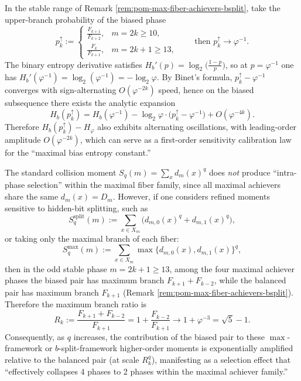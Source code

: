 \begin{remark}[Linear response and alternating oscillation of the maximal bias entropy constant: \texorpdfstring{$H_b'(\varphi^{-1})=-\log_2\varphi$}{Hb'(phi^{-1})=-log2 phi} (227)]\label{rem:pom-max-fiber-hidden-bit-entropy-linear-response}
In the stable range of Remark \ref{rem:pom-max-fiber-achievers-bsplit}, take the upper-branch probability of the biased phase
\[
p_k^{\uparrow}:=
\begin{cases}
\frac{F_{k+1}}{F_{k+2}},& m=2k\ge 10,\\
\frac{F_{k}}{F_{k+1}},& m=2k+1\ge 13,
\end{cases}
\qquad\text{then }p_k^{\uparrow}\to\varphi^{-1}.
\]
The binary entropy derivative satisfies \(H_b'(p)=\log_2\!\bigl(\frac{1-p}{p}\bigr)\), so at \(p=\varphi^{-1}\) one has \(H_b'(\varphi^{-1})=\log_2(\varphi^{-1})=-\log_2\varphi\).
By Binet's formula, \(p_k^{\uparrow}-\varphi^{-1}\) converges with sign-alternating \(O(\varphi^{-2k})\) speed, hence on the biased subsequence there exists the analytic expansion
\[
H_b(p_k^{\uparrow})
=H_b(\varphi^{-1})-\log_2\varphi\cdot\bigl(p_k^{\uparrow}-\varphi^{-1}\bigr)+O(\varphi^{-4k}).
\]
Therefore \(H_b(p_k^{\uparrow})-H_\varphi\) also exhibits alternating oscillations, with leading-order amplitude \(O(\varphi^{-2k})\), which can serve as a first-order sensitivity calibration law for the ``maximal bias entropy constant.''
\end{remark}

\begin{remark}\label{rem:pom-max-fiber-bsplit-phase-selection}
The standard collision moment \(S_q(m)=\sum_x d_m(x)^q\) does \emph{not} produce ``intra-phase selection'' within the maximal fiber family, since all maximal achievers share the same \(d_m(x)=D_m\).
However, if one considers refined moments sensitive to hidden-bit splitting, such as
\[
S_q^{\mathrm{split}}(m):=\sum_{x\in X_m}\bigl(d_{m,0}(x)^q+d_{m,1}(x)^q\bigr),
\]
or taking only the maximal branch of each fiber:
\[
S_q^{\max}(m):=\sum_{x\in X_m}\max\{d_{m,0}(x),d_{m,1}(x)\}^q,
\]
then in the odd stable phase \(m=2k+1\ge 13\), among the four maximal achiever phases the biased pair has maximum branch \(F_{k+1}+F_{k-2}\), while the balanced pair has maximum branch \(F_{k+1}\) (Remark \ref{rem:pom-max-fiber-achievers-bsplit}).
Therefore the maximum branch ratio is
\[
R_k:=\frac{F_{k+1}+F_{k-2}}{F_{k+1}}=1+\frac{F_{k-2}}{F_{k+1}}\longrightarrow 1+\varphi^{-3}=\sqrt5-1.
\]
Consequently, as \(q\) increases, the contribution of the biased pair to these \(\max\)-framework or \(b\)-split-framework higher-order moments is exponentially amplified relative to the balanced pair (at scale \(R_k^q\)), manifesting as a selection effect that ``effectively collapses 4 phases to 2 phases within the maximal achiever family.''
\end{remark}

